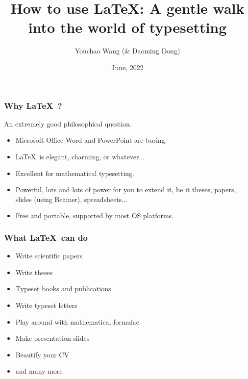 \documentclass[11pt]{beamer}
\title{How to use \LaTeX\xspace : \small{A gentle walk into the world of typesetting}}
\author{Youchao Wang (\& Daoming Dong)}
\institute{CMMPE, Engineering, University of Cambridge}
\date{June, 2022}
\begin{document}
\begin{frame}
	\titlepage
\end{frame}

\begin{frame}
	\frametitle{Why \LaTeX\ ?}
	An extremely good philosophical question.
	
	\begin{itemize}
		\item Microsoft Office Word and PowerPoint are boring.
		\item \LaTeX\ is elegant, charming, or whatever...
		\item Excellent for mathematical typesetting.
		\item Powerful, lots and lots of power for you to extend it, be it theses, papers, slides (using Beamer), spreadsheets...
		\item Free and portable, supported by most OS platforms.
	\end{itemize}

\end{frame}

\begin{frame}
\frametitle{What \LaTeX \ can do}

\begin{itemize}
	\item Write scientific papers
	\item Write theses
	\item Typeset books and publications
	\item Write typeset letters
	\item Play around with mathematical formulae
	\item Make presentation slides
	\item Beautify your CV
	\item and many more
\end{itemize}

\end{frame}
\end{document}
